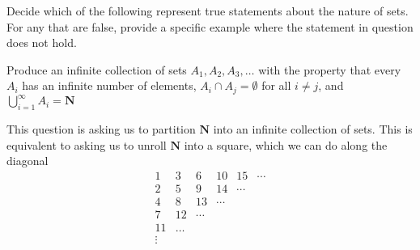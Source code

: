 \begin{exercise}
  Decide which of the following represent true statements about the nature of sets. For any that are false, provide a specific example where the statement in question does not hold.
\end{exercise}

\begin{solution}
\end{solution}

\begin{exercise}
  Produce an infinite collection of sets $A_{1}, A_{2}, A_{3}, \ldots$ with the property that every $A_{i}$ has an infinite number of elements, $A_{i} \cap A_{j}=\emptyset$ for all $i \neq j$, and $\bigcup_{i=1}^{\infty} A_{i}=\mathbf{N}$
\end{exercise}

\begin{solution}
  This question is asking us to partition $\mathbf N$ into an infinite collection of sets.
  This is equivalent to asking us to unroll $\mathbf N$ into a square, which we can do along the diagonal
  $$
  \begin{array}{lccccc}
    1 & 3 & 6 & 10 & 15 & \cdots \\
    2 & 5 & 9 & 14 & \cdots & \\
    4 & 8 & 13 & \cdots & & \\
    7 & 12 & \cdots & & & \\
    11 & \ldots & & & & \\
    \vdots & & & & &
  \end{array}
  $$
\end{solution}

